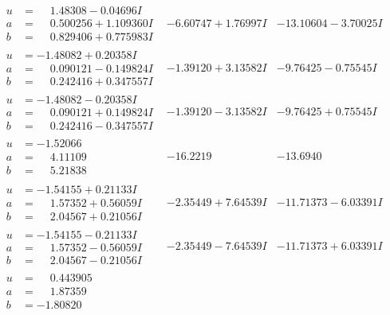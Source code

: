 \documentclass[1p]{elsarticle_modified}
\theoremstyle{definition}
\begin{document}
$$\begin{array}{c|c|c}
\begin{aligned}
u &= \phantom{-}1.48308 - 0.04696 I \\
a &= \phantom{-}0.500256 + 1.109360 I \\
b &= \phantom{-}0.829406 + 0.775983 I\end{aligned}
 & -6.60747 + 1.76997 I & -13.10604 - 3.70025 I \\ \hline\begin{aligned}
u &= -1.48082 + 0.20358 I \\
a &= \phantom{-}0.090121 - 0.149824 I \\
b &= \phantom{-}0.242416 + 0.347557 I\end{aligned}
 & -1.39120 + 3.13582 I & -9.76425 - 0.75545 I \\ \hline\begin{aligned}
u &= -1.48082 - 0.20358 I \\
a &= \phantom{-}0.090121 + 0.149824 I \\
b &= \phantom{-}0.242416 - 0.347557 I\end{aligned}
 & -1.39120 - 3.13582 I & -9.76425 + 0.75545 I \\ \hline\begin{aligned}
u &= -1.52066\phantom{ +0.000000I} \\
a &= \phantom{-}4.11109\phantom{ +0.000000I} \\
b &= \phantom{-}5.21838\phantom{ +0.000000I}\end{aligned}
 & -16.2219\phantom{ +0.000000I} & -13.6940\phantom{ +0.000000I} \\ \hline\begin{aligned}
u &= -1.54155 + 0.21133 I \\
a &= \phantom{-}1.57352 + 0.56059 I \\
b &= \phantom{-}2.04567 + 0.21056 I\end{aligned}
 & -2.35449 + 7.64539 I & -11.71373 - 6.03391 I \\ \hline\begin{aligned}
u &= -1.54155 - 0.21133 I \\
a &= \phantom{-}1.57352 - 0.56059 I \\
b &= \phantom{-}2.04567 - 0.21056 I\end{aligned}
 & -2.35449 - 7.64539 I & -11.71373 + 6.03391 I \\ \hline\begin{aligned}
u &= \phantom{-}0.443905\phantom{ +0.000000I} \\
a &= \phantom{-}1.87359\phantom{ +0.000000I} \\
b &= -1.80820\phantom{ +0.000000I}\end{aligned}

\end{array}$$
\end{document}
